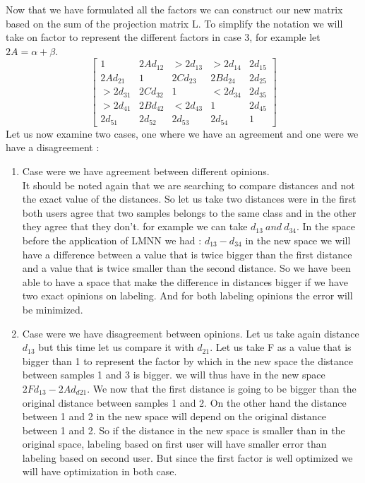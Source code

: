 \documentclass[hidelinks,12pt]{report}
\begin{document}
\begin{enumerate}
Now that we have formulated all the factors we can construct our new matrix based on the sum of the projection matrix L. To simplify the notation we will take on factor to represent the different factors in case 3, for example let $2A=\alpha+\beta$.
\[
\begin{bmatrix}
1            & 2Ad_{12} & >2d_{13}  & >2d_{14} & 2d_{15} \\
2Ad_{21}     & 1        & 2Cd_{23}  & 2Bd_{24} & 2d_{25} \\
>2d_{31}     & 2Cd_{32} & 1         & <2d_{34} & 2d_{35} \\
>2d_{41}     & 2Bd_{42} & <2d_{43}  & 1        & 2d_{45} \\
2d_{51}      & 2d_{52}  & 2d_{53}   & 2d_{54}  & 1
\end{bmatrix}
\]
Let us now examine two cases, one where we have an agreement and one were we have a disagreement :
\begin{enumerate}
\item Case were we have agreement between different opinions.\\
It should be noted again that we are searching to compare distances and not the exact value of the distances. So let us take two distances were in the first both users agree that two samples belongs to the same class and in the other they agree that they don't.  for example we can take $d_{13} \ and \ d_{34}$. In the space before the application of LMNN we had : $d_{13}-d_{34}$ in the new space we will have a difference between a value that is twice bigger than the first distance and a value that is twice smaller than the second distance. So we have been able to have a space that make the difference in distances bigger if we have two exact opinions on labeling. And for both labeling opinions the error will be minimized.
\item Case were we have disagreement between opinions.
Let us take again distance $d_13$ but this time let us compare it with $d_21$. Let us take F as a value that is bigger than 1 to represent the factor by which in the new space the distance between samples 1 and 3 is bigger. we will thus have in the new space $2Fd_{13}-2Ad_{d21}$. We now that the first distance is going to be bigger than the original distance between samples 1 and 2. On the other hand the distance between 1 and 2 in the new space will depend on the original distance between 1 and 2. So if the distance in the new space is smaller than in the original space, labeling based on first user will have smaller error than labeling based on second user. But since the first factor is well optimized we will have optimization in both case. \\

\end{enumerate}
\end{enumerate}
\end{document}
